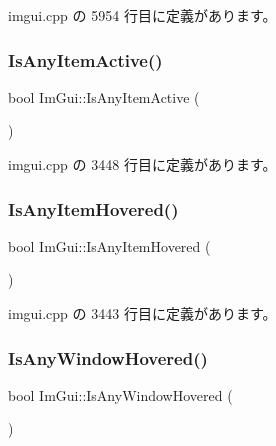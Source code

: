  imgui.\+cpp の 5954 行目に定義があります。

\mbox{\label{namespace_im_gui_acdc18199d50d26919312db5f9707b8dc}} 
\subsubsection{\texorpdfstring{Is\+Any\+Item\+Active()}{IsAnyItemActive()}}
{\footnotesize\ttfamily bool Im\+Gui\+::\+Is\+Any\+Item\+Active (\begin{DoxyParamCaption}{ }\end{DoxyParamCaption})}



 imgui.\+cpp の 3448 行目に定義があります。

\mbox{\label{namespace_im_gui_a0512146617bb55e24ebcfbe3ce6553d5}} 
\subsubsection{\texorpdfstring{Is\+Any\+Item\+Hovered()}{IsAnyItemHovered()}}
{\footnotesize\ttfamily bool Im\+Gui\+::\+Is\+Any\+Item\+Hovered (\begin{DoxyParamCaption}{ }\end{DoxyParamCaption})}



 imgui.\+cpp の 3443 行目に定義があります。

\mbox{\label{namespace_im_gui_a62379e94283e247288c9a6c15a2b797e}} 
\subsubsection{\texorpdfstring{Is\+Any\+Window\+Hovered()}{IsAnyWindowHovered()}}
{\footnotesize\ttfamily bool Im\+Gui\+::\+Is\+Any\+Window\+Hovered (\begin{DoxyParamCaption}{ }\end{DoxyParamCaption})}



